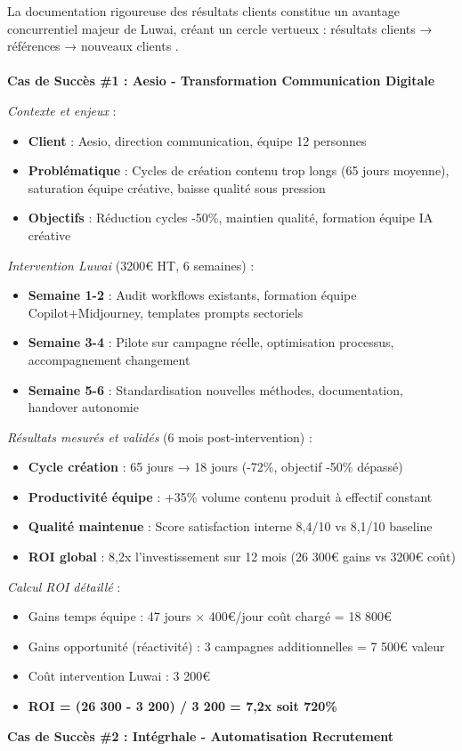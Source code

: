 La documentation rigoureuse des résultats clients constitue un avantage concurrentiel majeur de Luwai, créant un cercle vertueux : résultats clients → références → nouveaux clients \cite{reichheld2001loyalty}.
\\\\
\textbf{Cas de Succès \#1 : Aesio - Transformation Communication Digitale}

\emph{Contexte et enjeux} \cite{luwai2025aesio} :
\begin{itemize}
    \item \textbf{Client} : Aesio, direction communication, équipe 12 personnes
    \item \textbf{Problématique} : Cycles de création contenu trop longs (65 jours moyenne), saturation équipe créative, baisse qualité sous pression
    \item \textbf{Objectifs} : Réduction cycles -50\%, maintien qualité, formation équipe IA créative
\end{itemize}
\medskip
\emph{Intervention Luwai} (3200€ HT, 6 semaines) :
\begin{itemize}
    \item \textbf{Semaine 1-2} : Audit workflows existants, formation équipe Copilot+Midjourney, templates prompts sectoriels
    \item \textbf{Semaine 3-4} : Pilote sur campagne réelle, optimisation processus, accompagnement changement
    \item \textbf{Semaine 5-6} : Standardisation nouvelles méthodes, documentation, handover autonomie
\end{itemize}
\medskip
\emph{Résultats mesurés et validés} (6 mois post-intervention) :
\begin{itemize}
    \item \textbf{Cycle création} : 65 jours → 18 jours (-72\%, objectif -50\% dépassé)
    \item \textbf{Productivité équipe} : +35\% volume contenu produit à effectif constant
    \item \textbf{Qualité maintenue} : Score satisfaction interne 8,4/10 vs 8,1/10 baseline
    \item \textbf{ROI global} : 8,2x l'investissement sur 12 mois (26 300€ gains vs 3200€ coût)
\end{itemize}
\medskip
\emph{Calcul ROI détaillé} :
\begin{itemize}
    \item Gains temps équipe : 47 jours × 400€/jour coût chargé = 18 800€
    \item Gains opportunité (réactivité) : 3 campagnes additionnelles = 7 500€ valeur
    \item Coût intervention Luwai : 3 200€
    \item \textbf{ROI = (26 300 - 3 200) / 3 200 = 7,2x soit 720\%}
\end{itemize}
\medskip
\textbf{Cas de Succès \#2 : Intégrhale - Automatisation Recrutement}

